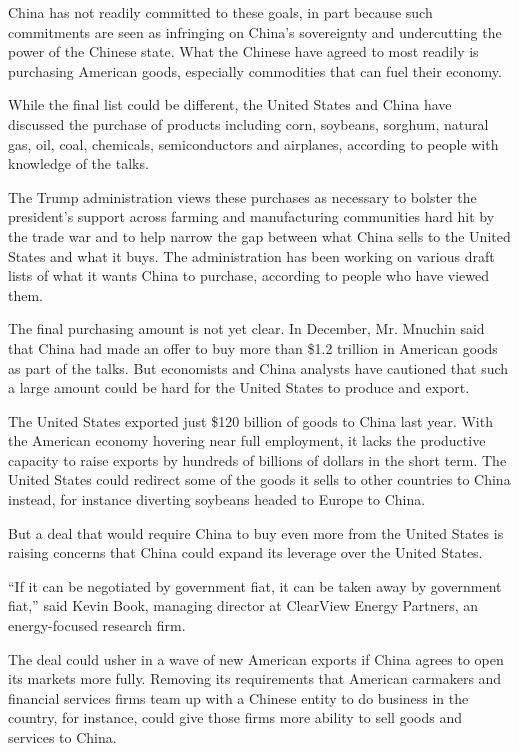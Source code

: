 China has not readily committed to these goals, in part because such
commitments are seen as infringing on China's sovereignty and
undercutting the power of the Chinese state. What the Chinese have
agreed to most readily is purchasing American goods, especially
commodities that can fuel their economy.

While the final list could be different, the United States and China
have discussed the purchase of products including corn, soybeans,
sorghum, natural gas, oil, coal, chemicals, semiconductors and
airplanes, according to people with knowledge of the talks.

The Trump administration views these purchases as necessary to bolster
the president's support across farming and manufacturing communities
hard hit by the trade war and to help narrow the gap between what China
sells to the United States and what it buys. The administration has been
working on various draft lists of what it wants China to purchase,
according to people who have viewed them.

The final purchasing amount is not yet clear. In December, Mr. Mnuchin
said that China had made an offer to buy more than \$1.2 trillion in
American goods as part of the talks. But economists and China analysts
have cautioned that such a large amount could be hard for the United
States to produce and export.

The United States exported just \$120 billion of goods to China last
year. With the American economy hovering near full employment, it lacks
the productive capacity to raise exports by hundreds of billions of
dollars in the short term. The United States could redirect some of the
goods it sells to other countries to China instead, for instance
diverting soybeans headed to Europe to China.

But a deal that would require China to buy even more from the United
States is raising concerns that China could expand its leverage over the
United States.

``If it can be negotiated by government fiat, it can be taken away by
government fiat,'' said Kevin Book, managing director at ClearView
Energy Partners, an energy-focused research firm.

The deal could usher in a wave of new American exports if China agrees
to open its markets more fully. Removing its requirements that American
carmakers and financial services firms team up with a Chinese entity to
do business in the country, for instance, could give those firms more
ability to sell goods and services to China.

